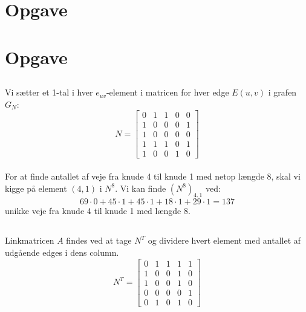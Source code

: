 \documentclass[a4paper,12pt]{article}
\begin{document}
\section[Opgave]{Opgave}
\subsection{}


\subsection{}


\subsection{}


\section[Opgave]{Opgave}
\subsection{}
Vi sætter et 1-tal i hver $e_{uv}$-element i matricen for hver edge $E(u,v)$ i grafen $G_N$:\\

\[
N = 
\left[\begin{array}{ccccc}
    0 & 1 & 1 & 0 & 0 \\
    1 & 0 & 0 & 0 & 1 \\
    1 & 0 & 0 & 0 & 0 \\
    1 & 1 & 1 & 0 & 1 \\
    1 & 0 & 0 & 1 & 0 
\end{array}\right]
\]\\

For at finde antallet af veje fra knude 4 til knude 1 med netop længde 8, skal vi kigge på element $(4,1)$ i $N^8$. Vi kan finde $(N^8)_{4,1}$ ved:\\
\[
69 \cdot 0 + 45 \cdot 1 + 45 \cdot 1 + 18 \cdot 1 + 29 \cdot 1 = 137
\]
unikke veje fra knude 4 til knude 1 med længde 8.\\

\subsection{}
Linkmatricen $A$ findes ved at tage $N^T$ og dividere hvert element med antallet af udgående edges i dens column.\\
\[
N^T =
\left[\begin{array}{ccccc}
    0 & 1 & 1 & 1 & 1 \\
    1 & 0 & 0 & 1 & 0 \\
    1 & 0 & 0 & 1 & 0 \\
    0 & 0 & 0 & 0 & 1 \\
    0 & 1 & 0 & 1 & 0
\end{array}\right]
\]
\end{document}
